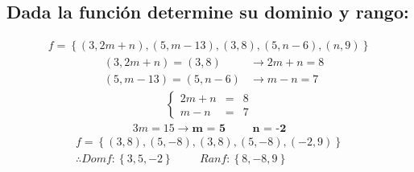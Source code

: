 \documentclass[10pt, a4paper]{article}
\begin{document}
\begin{multicols*}{2}
  \subsection{\small Dada la función determine su dominio y rango:}
  \vspace{-0.9cm}
  \begin{align*}
    f=\left\{\left(3, 2m+n\right),\left(5,m-13\right),\left(3,8\right),\left(5,n-6\right),\left(n,9\right)\right\}
  \end{align*}
  \vspace{-0.4cm}
  \begin{align*}
    &\left(3,2m+n\right) = \left(3,8\right) &\rightarrow 2m+n = 8\\
    &\left(5,m-13\right) = \left(5,n-6\right) &\rightarrow m-n = 7
  \end{align*}
  \vspace{-0.4cm}
  \begin{align*}
    \left\{
    \begin{array}{rcl}
      2m+n &= &8\\
      m-n &= &7
    \end{array}
    \right.
  \end{align*}
  \vspace{-0.2cm}
  \begin{align*}
    3m = 15 \rightarrow \textbf{m = 5} \hspace{1cm} \textbf{n = -2}
  \end{align*}
  \vspace{-0.2cm}
  \begin{align*}
    f=\left\{\left(3,8\right),\left(5,-8\right),\left(3,8\right),\left(5,-8\right),\left(-2,9\right)\right\}\\
    \therefore Domf: \left\{3,5,-2\right\} \hspace{1cm} Ranf: \left\{8,-8,9\right\}
  \end{align*}

\end{multicols*}
\end{document}
